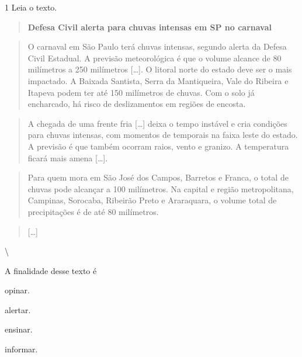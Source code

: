 
\num{1} Leia o texto.

\begin{quote}
\textbf{Defesa Civil alerta para chuvas intensas em SP no carnaval}
\end{quote}

\begin{quote}
O carnaval em São Paulo terá chuvas intensas, segundo alerta da Defesa
Civil Estadual. A previsão meteorológica é que o volume alcance de 80
milímetros a 250 milímetros {[}\ldots{]}. O litoral norte do estado deve
ser o mais impactado. A Baixada Santista, Serra da Mantiqueira, Vale do
Ribeira e Itapeva podem ter até 150 milímetros de chuvas. Com o solo já
encharcado, há risco de deslizamentos em regiões de encosta.
\end{quote}

\begin{quote}
A chegada de uma frente fria {[}\ldots{]} deixa o tempo instável e cria
condições para chuvas intensas, com momentos de temporais na faixa leste
do estado. A previsão é que também ocorram raios, vento e granizo. A
temperatura ficará mais amena {[}\ldots{]}.
\end{quote}

\begin{quote}
Para quem mora em São José dos Campos, Barretos e Franca, o total de
chuvas pode alcançar a 100 milímetros. Na capital e região
metropolitana, Campinas, Sorocaba, Ribeirão Preto e Araraquara, o volume
total de precipitações é de até 80 milímetros.
\end{quote}

\begin{quote}
{[}\ldots{]}
\end{quote}

\textbackslash {}

A finalidade desse texto é

\begin{escolha}

\item opinar.

\item alertar.

\item ensinar.

\item informar.
\end{escolha}

